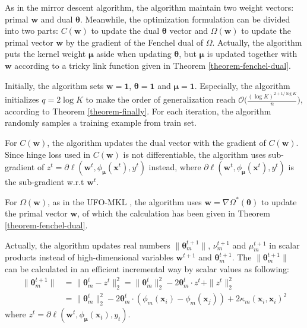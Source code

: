 \documentclass{article}
\begin{document}
 As in the mirror descent algorithm, the algorithm maintain two weight vectors: primal $\mathbf w$ and dual $\pmb{\theta}$.
 Meanwhile, the optimization formulation can be divided into two parts: $C(\mathbf w)$
 to update the dual $\pmb{\theta}$ vector and $\Omega(\mathbf w)$ to update the primal vector $\mathbf w$ by
 the gradient of the Fenchel dual of $\Omega$.
 Actually, the algorithm puts the kernel weight $\pmb{\mu}$ aside when updating $\pmb{\theta}$,
 but $\pmb{\mu}$ is updated together with $\mathbf w$ according to a tricky link function given in Theorem \ref{theorem-fenchel-dual}.

Initially, the algorithm sets $\mathbf{w}=\mathbf{1}$, $\pmb{\theta}=\mathbf{1}$ and $\pmb{\mu}=\mathbf{1}$.
Especially, the algorithm initializes $q=2\log K$ to make the order of generalization reach
$\mathcal{O}\big(\frac{(\log K)^{2+1/\log K}}{n}\big)$, according to Theorem \ref{theorem-finally}.
For each iteration, the algorithm randomly samples a training example from train set.

For $C(\mathbf w)$, the algorithm updates the dual vector with the gradient of $C(\mathbf w)$.
Since hinge loss used in $C(\mathbf w)$ is not differentiable,
the algorithm uses sub-gradient of $z^t=\partial\ell(\mathbf w^t,\phi_{\bm \mu}(\mathbf{x}^t), y^t)$ instead,
where $\partial\ell(\mathbf w^t,\phi_{\bm \mu}(\mathbf{x}^t), y^t)$ is the sub-gradient w.r.t $\mathbf w^t$.

For $\Omega(\mathbf w)$, as in the UFO-MKL \cite{OrabonaL11},
the algorithm uses $\mathbf w=\nabla\Omega^\ast(\pmb{\theta})$ to update the primal vector $\mathbf w$,
of which the calculation has been given in Theorem \ref{theorem-fenchel-dual}.

Actually, the algorithm updates real numbers $\|\bm \theta_m^{t+1}\|$, $\nu_m^{t+1}$ and $\mu_m^{t+1}$ in scalar products instead of
high-dimensional variables $\mathbf w^{t+1}$ and $\bm \theta_m^{t+1}$.
The $\|\bm \theta_m^{t+1}\|$ can be calculated in an efficient incremental way by scalar values as following:
\begin{align*}
\|\pmb{\theta}_m^{t+1}\|
&=\|\pmb{\theta}_m^{t}-z^t\|_2^2
=\|\pmb{\theta}_m^{t}\|_2^2-2\pmb{\theta}_m^t \cdot z^t +\|z^t\|_2^2\\
&=\|\pmb{\theta}_m^{t}\|_2^2-2\pmb{\theta}_m^t \cdot (\phi_m(\mathbf{x}_i)-\phi_m(\mathbf{x}_j))
+ 2\kappa_m(\mathbf{x}_i, \mathbf{x}_i)^2
\end{align*}
where $z^t=\partial\ell(\mathbf w^t,\phi_{\bm \mu}(\mathbf{x}_t), y_t)$.
\end{document}
